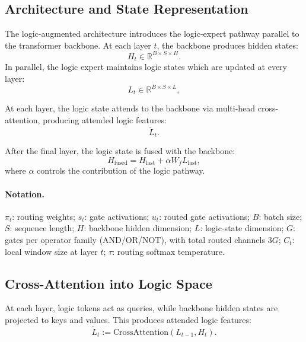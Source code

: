 \documentclass[10pt,twocolumn,letterpaper]{article}
\begin{document}
\subsection{Architecture and State Representation}

The logic-augmented architecture introduces the logic-expert pathway parallel to
the transformer backbone. At each layer $t$, the backbone produces hidden states:
\begin{equation}
H_t \in \mathbb{R}^{B \times S \times H}.
\end{equation}
In parallel, the logic expert maintains logic states which are updated at every layer:
\begin{equation}
L_t \in \mathbb{R}^{B \times S \times L},
\end{equation}

At each layer, the logic state attends to the backbone via multi-head cross-attention,
producing attended logic features:
\begin{equation}
\tilde{L}_t.
\end{equation}

After the final layer, the logic state is fused with the backbone:
\begin{equation}
H_{\text{fused}} = H_{\text{last}} + \alpha W_f L_{\text{last}},
\label{eq:fusion}
\end{equation}
where $\alpha$ controls the contribution of the logic pathway.

\paragraph{Notation.}
$\pi_t$: routing weights; $s_t$: gate activations; $u_t$: routed gate activations;
$B$: batch size; $S$: sequence length; $H$: backbone hidden dimension;
$L$: logic-state dimension; $G$: gates per operator family (AND/OR/NOT), with
total routed channels $3G$; $C_t$: local window size at layer $t$;
$\tau$: routing softmax temperature.

\subsection{Cross-Attention into Logic Space}

At each layer, logic tokens act as queries, while backbone hidden states are projected
to keys and values. This produces attended logic features:
\begin{equation}
\tilde{L}_t := \text{CrossAttention}(L_{t-1}, H_t).
\end{equation}
\end{document}
